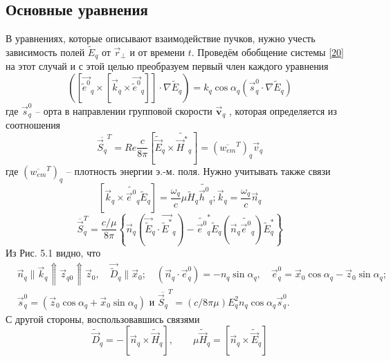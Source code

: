 \documentclass[a4paper]{article}
\begin{document}
\subsection{Основные уравнения}
В уравнениях, которые описывают взаимодействие пучков, нужно учесть зависимость полей $\tilde{E}_{q}$  от $\vec{r}_{\perp}$  и от времени $t$. Проведём обобщение системы  \eqref{20} на этот случай и с этой целью преобразуем первый член каждого уравнения 
\begin{equation}
	\left(\left[\vec{\tilde{e}^{0}}_{q}\times\left[\vec{k}_{q}\times\vec{\tilde{e}^{0}}_{q}\right]\right]\cdot\nabla\tilde{E}_{q}\right)=k_{q}\cos\alpha_{q}\left(\vec{s}_{q}^{0}\cdot\nabla\tilde{E}_{q}\right)\label{1.5.1}
\end{equation}
где $\vec{s}_{q}^{0}$ -- орта в направлении групповой скорости  $\vec{\textbf{v}}_{q}$ , которая определяется из соотношения 
\begin{equation}
	\overline{\vec{S}_{q}}^{T}=Re\frac{c}{8\pi}\left[\tilde{\vec{E}}_{q}\times\tilde{\vec{H}^{*}}_{q}\right]=\left(\overline{w_{em}}^{T}\right)_{q}\vec{v}_{q}	\label{1.5.2}
\end{equation}
где $\left(\overline{w_{em}}^{T}\right)_{q}$ -- плотность энергии э.-м. поля. Нужно учитывать также связи
$$\left[\vec{k}_{q}\times\tilde{\vec{e}^{0}}_{q}\tilde{E}_{q}\right]=\frac{\omega_{q}}{c}\mu\tilde{H}_{q}\tilde{\vec{h}^{0}}_{q};\vec{k}_{q}=\frac{\omega_{q}}{c}\vec{n}_{q}$$
$$\overline{\vec{S}}_{q}^{T}=\frac{c/\mu}{8\pi}\left\{\vec{n}_{q}\left(\vec{\tilde{E}}_{q}\cdot\vec{\tilde{E}^{*}}_{q}\right)-\tilde{\vec{e}^{0}}^{*}_{q}\tilde{E}_{q}\left(\vec{n}_{q}\tilde{\vec{e}^{0}}_{q}\right)\tilde{E}_{q}^{*}\right\}$$
Из Рис. 5.1 видно, что 
\begin{equation}
	\begin{split}
		&\vec{n}_{q}\parallel\vec{k}_{q}\Uparrow\vec{z}_{q0}\Uparrow\vec{z}_{0},\quad\vec{\tilde{D}}_{q}\parallel\vec{x}_{0};\quad\left(\vec{n}_{q}\cdot\vec{e}_{q}^{0}\right)=-n_{q}\sin\alpha_{q},\quad\vec{e}_{q}^{0}=\vec{x}_{0}\cos\alpha_{q}-\vec{z}_{0}\sin\alpha_{q};\\
		&\vec{s}_{q}^{0}=\left(\vec{z}_{0}\cos\alpha_{q}+\vec{x}_{0}\sin\alpha_{q}\right)\text{ и }\overline{\vec{S}_{q}}^{T}=\left(c/8\pi\mu\right)E_{q}^{2}n_{q}\cos\alpha_{q}\vec{s}_{q}^{0}.
	\end{split}
	\tag{2'}\label{1.5.2'}
\end{equation}
С другой стороны, воспользовавшись связями $$\tilde{\vec{D}}_{q}=-\left[\vec{n}_{q}\times\tilde{\vec{H}}_{q}\right],\qquad\mu\tilde{\vec{H}}_{q}=\left[\vec{n}_{q}\times\tilde{\vec{E}}_{q}\right]$$
\end{document}
